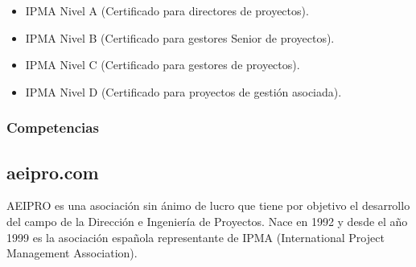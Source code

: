 \begin{itemize}
	\item IPMA Nivel A (Certificado para directores de proyectos).
	\item IPMA Nivel B (Certificado para gestores Senior de proyectos).
	\item IPMA Nivel C (Certificado para gestores de proyectos).
	\item IPMA Nivel D (Certificado para proyectos de gestión asociada).
\end{itemize}

\subsubsection{Competencias}

\subsection{aeipro.com}

AEIPRO es una asociación sin ánimo de lucro que tiene por objetivo el desarrollo del campo de la Dirección e Ingeniería de Proyectos. Nace en 1992 y desde el año 1999 es la asociación española representante de IPMA (International Project Management Association).
